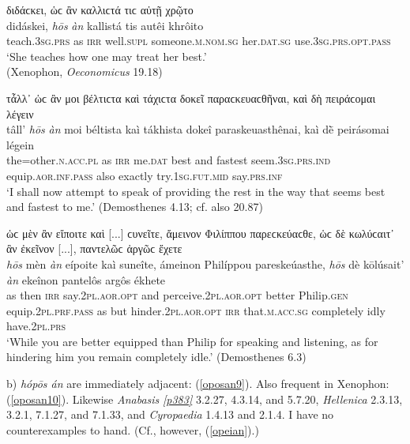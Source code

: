\begin{exe}
\ex διδάϲκει, ὡϲ ἂν καλλιϲτά τιϲ αὐτῇ χρῷτο\\
\gll didáskei, \emph{hōs} \emph{àn} kallistá tis autêi khrôito\\
teach.\textsc{3sg.prs} as \textsc{irr} well.\textsc{supl}
someone.\textsc{m.nom.sg} her.\textsc{dat.sg} use.\textsc{3sg.prs.opt.pass}\\
\trans `She teaches how one may treat her best.'\\
(Xenophon, \textit{Oeconomicus} 19.18)
\label{hosan21}
\end{exe}

\begin{exe}
\ex τἆλλ᾽ ὡϲ ἂν μοι βέλτιϲτα καὶ τάχιϲτα δοκεῖ παραϲκευαϲθῆναι, καὶ δὴ πειράϲομαι λέγειν\\
\gll tâll' \emph{hōs} \emph{àn} moi béltista kaì tákhista dokeî paraskeuasthênai, kaì dḕ peirásomai légein\\
the=other.\textsc{n.acc.pl} as \textsc{irr} me.\textsc{dat} best and fastest seem.\textsc{3sg.prs.ind} equip.\textsc{aor.inf.pass} also exactly try.\textsc{1sg.fut.mid} say.\textsc{prs.inf}\\
\trans `I shall now attempt to speak of providing the rest in the way that seems best and fastest to me.' (Demosthenes 4.13; cf. also 20.87)
\label{hosan22}
\end{exe}

\begin{exe}
\ex ὡϲ μὲν ἂν εἴποιτε καὶ {[}...{]} ϲυνεῖτε, ἄμεινον Φιλίππου παρεϲκεύαϲθε, ὡϲ δὲ κωλύϲαιτ᾽ ἂν ἐκεῖνον {[}...{]}, παντελῶϲ ἀργῶϲ ἔχετε\\
\gll \emph{hōs} mèn \emph{àn} eípoite kaì suneîte, ámeinon Philíppou pareskeúasthe, \emph{hōs} dè kōlúsait' \emph{àn} ekeînon pantelôs argôs ékhete\\
as then \textsc{irr} say.\textsc{2pl.aor.opt} and perceive.\textsc{2pl.aor.opt} better Philip.\textsc{gen} equip.\textsc{2pl.prf.pass} as but hinder.\textsc{2pl.aor.opt} \textsc{irr} that.\textsc{m.acc.sg} completely idly have.\textsc{2pl.prs}\\
\trans `While you are better equipped than Philip for speaking and listening, as for hindering him you remain completely idle.' (Demosthenes 6.3)
\label{hosan23}
\end{exe}

b) \textit{hópōs án} are immediately adjacent: (\ref{oposan9}). Also frequent in Xenophon: (\ref{oposan10}). Likewise \textit{Anabasis} \hyperlink{p383}{\emph{[p383]}} 3.2.27, 4.3.14, and 5.7.20, \textit{Hellenica} 2.3.13, 3.2.1, 7.1.27, and 7.1.33, and \textit{Cyropaedia} 1.4.13 and 2.1.4. I have no counterexamples to hand. (Cf., however, (\ref{opeian}).)


